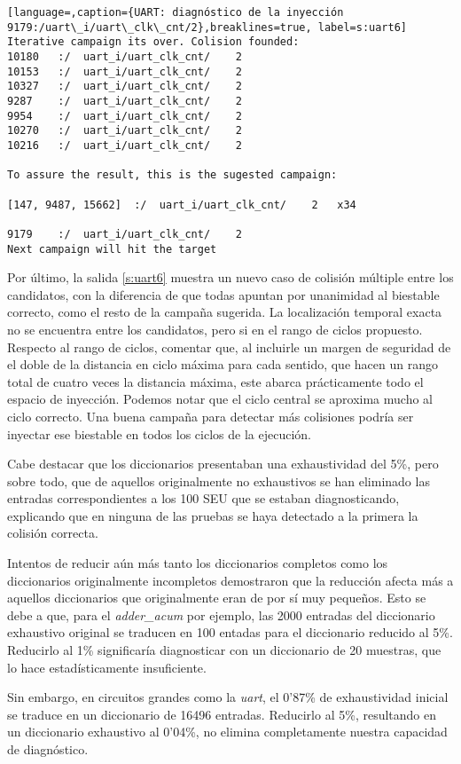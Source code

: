 \begin{lstlisting}[language=,caption={UART: diagnóstico de la inyección
9179:/uart\_i/uart\_clk\_cnt/2},breaklines=true, label=s:uart6]
Iterative campaign its over. Colision founded:
10180	:/	uart_i/uart_clk_cnt/	2
10153	:/	uart_i/uart_clk_cnt/	2
10327	:/	uart_i/uart_clk_cnt/	2
9287	:/	uart_i/uart_clk_cnt/	2
9954	:/	uart_i/uart_clk_cnt/	2
10270	:/	uart_i/uart_clk_cnt/	2
10216	:/	uart_i/uart_clk_cnt/	2

To assure the result, this is the sugested campaign:

[147, 9487, 15662]	:/	uart_i/uart_clk_cnt/	2	x34

9179	:/	uart_i/uart_clk_cnt/	2
Next campaign will hit the target
\end{lstlisting}

Por último, la salida \ref{s:uart6} muestra un nuevo caso de colisión múltiple
entre los candidatos, con la diferencia de que todas apuntan por unanimidad al
biestable correcto, como el resto de la campaña sugerida. La localización temporal 
exacta no se encuentra entre los candidatos, pero si en el rango de ciclos
propuesto. Respecto al rango de ciclos, comentar que, al incluirle un margen de
seguridad de el doble de la distancia en ciclo máxima para cada sentido, que hacen
un rango total de cuatro veces la distancia máxima, este abarca prácticamente todo
el espacio de inyección. Podemos notar que el ciclo central se aproxima mucho al
ciclo correcto. Una buena campaña para detectar más colisiones podría ser
inyectar ese biestable en todos los ciclos de la ejecución.

Cabe destacar que los diccionarios presentaban una exhaustividad del 5\%, pero
sobre todo, que de aquellos originalmente no exhaustivos se han eliminado las
entradas correspondientes a los 100 \gls{SEU} que se estaban diagnosticando,
explicando que en ninguna de las pruebas se haya detectado a la primera la
colisión correcta.

Intentos de reducir aún más tanto los diccionarios completos como los diccionarios 
originalmente incompletos demostraron que la reducción afecta más a aquellos
diccionarios que originalmente eran de por sí muy pequeños. Esto se debe a que,
para el \textit{adder\_acum} por ejemplo, las 2000 entradas del diccionario
exhaustivo original se traducen en 100 entadas para el diccionario reducido al
5\%. Reducirlo al 1\% significaría diagnosticar con un diccionario de 20 muestras,
que lo hace estadísticamente insuficiente.

Sin embargo, en circuitos grandes como la \textit{uart}, el 0'87\% de
exhaustividad inicial se traduce en un diccionario de 16496 entradas. Reducirlo al
5\%, resultando en un diccionario exhaustivo al 0'04\%, no elimina completamente
nuestra capacidad de diagnóstico.

\endinput
